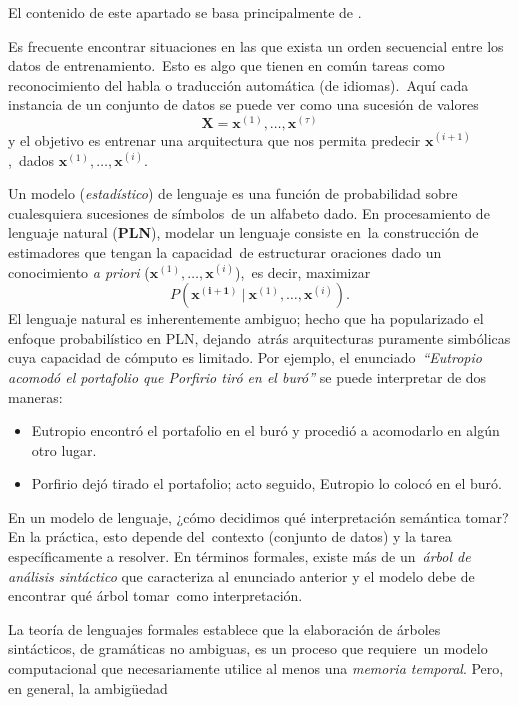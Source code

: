 \noindent
El contenido de este apartado se basa principalmente de \cite{goodfellow-et-al-2016}.\par
Es frecuente encontrar situaciones en las que exista un orden secuencial entre los datos de entrenamiento.\
Esto es algo que tienen en común tareas como reconocimiento del habla o traducción automática (de idiomas).\
Aquí cada instancia de un conjunto de datos se puede ver como una sucesión de valores
\[\mathbf{X} = \mathbf{x}^{(1)},\ldots,\mathbf{x}^{(\tau)}\]
y el objetivo es entrenar una arquitectura que nos permita predecir $\mathbf{x}^{(i+1)}$,\
dados $\mathbf{x}^{(1)},\ldots,\mathbf{x}^{(i)}$.\par
Un modelo (\emph{estadístico}) de lenguaje es una función de probabilidad sobre cualesquiera sucesiones de símbolos\
de un alfabeto dado. En procesamiento de lenguaje natural (\textbf{PLN}), modelar un lenguaje consiste en\
la construcción de estimadores que tengan la capacidad\
de estructurar oraciones dado un conocimiento \emph{a priori} ($\mathbf{x}^{(1)},\ldots,\mathbf{x}^{(i)}$),\
es decir, maximizar
\begin{equation}
  P(\mathbf{x^{(i+1)}}\ |\ \mathbf{x}^{(1)},\ldots,\mathbf{x}^{(i)}).
\end{equation}
El lenguaje natural es inherentemente ambiguo; hecho que ha popularizado el enfoque probabilístico en PLN, dejando\
atrás arquitecturas puramente simbólicas cuya capacidad de cómputo es limitado. Por ejemplo, el enunciado\
\emph{``Eutropio acomodó el portafolio que Porfirio tiró en el buró''} se puede interpretar de dos maneras:
\begin{itemize}
\item Eutropio encontró el portafolio en el buró y procedió a acomodarlo en algún otro lugar.
\item Porfirio dejó tirado el portafolio; acto seguido, Eutropio lo colocó en el buró.
\end{itemize}\par
En un modelo de lenguaje, ¿cómo decidimos qué interpretación semántica tomar? En la práctica, esto depende del\
contexto (conjunto de datos) y la tarea específicamente a resolver. En términos formales, existe más de un\
\emph{árbol de análisis sintáctico} que caracteriza al enunciado anterior y el modelo debe de encontrar qué árbol tomar\
como interpretación.\par
La teoría de lenguajes formales establece que la elaboración de árboles sintácticos, de gramáticas no ambiguas, es un proceso que requiere\
un modelo computacional que necesariamente utilice al menos una \emph{memoria temporal}. Pero, en general, la ambigüedad\
